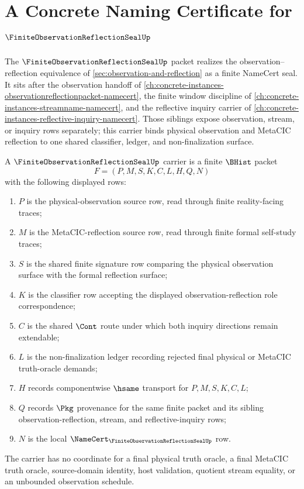 \chapter{A Concrete Naming Certificate for $\FiniteObservationReflectionSealUp$}
\label{ch:concrete-instances-finite-observation-reflection-seal-namecert}

The $\FiniteObservationReflectionSealUp$ packet realizes the observation--reflection equivalence of \autoref{sec:observation-and-reflection} as a finite NameCert seal. It sits after the observation handoff of \autoref{ch:concrete-instances-observationreflectionpacket-namecert}, the finite window discipline of \autoref{ch:concrete-instances-streamname-namecert}, and the reflective inquiry carrier of \autoref{ch:concrete-instances-reflective-inquiry-namecert}. Those siblings expose observation, stream, or inquiry rows separately; this carrier binds physical observation and MetaCIC reflection to one shared classifier, ledger, and non-finalization surface.

\begin{definition}
\label{def:finite-observation-reflection-seal-carrier}
A $\FiniteObservationReflectionSealUp$ carrier is a finite $\BHist$ packet
$$
F=(P,M,S,K,C,L,H,Q,N)
$$
with the following displayed rows:
\begin{enumerate}
\item $P$ is the physical-observation source row, read through finite reality-facing traces;
\item $M$ is the MetaCIC-reflection source row, read through finite formal self-study traces;
\item $S$ is the shared finite signature row comparing the physical observation surface with the formal reflection surface;
\item $K$ is the classifier row accepting the displayed observation-reflection role correspondence;
\item $C$ is the shared $\Cont$ route under which both inquiry directions remain extendable;
\item $L$ is the non-finalization ledger recording rejected final physical or MetaCIC truth-oracle demands;
\item $H$ records componentwise $\hsame$ transport for $P,M,S,K,C,L$;
\item $Q$ records $\Pkg$ provenance for the same finite packet and its sibling observation-reflection, stream, and reflective-inquiry rows;
\item $N$ is the local $\NameCert_{\FiniteObservationReflectionSealUp}$ row.
\end{enumerate}
The carrier has no coordinate for a final physical truth oracle, a final MetaCIC truth oracle, source-domain identity, host validation, quotient stream equality, or an unbounded observation schedule.
\end{definition}


